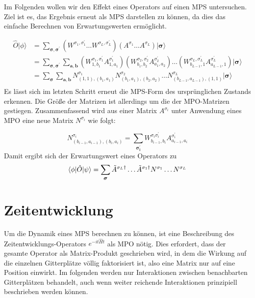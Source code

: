 \documentclass[10pt,a4paper]{report}
\begin{document}
Im Folgenden wollen wir den Effekt eines Operators auf einen MPS untersuchen. Ziel ist es, das Ergebnis erneut als MPS darstellen zu können, da dies das einfache Berechnen von Erwartungswerten ermöglicht.

\begin{equation}\label{MPO_MPS_equ}
\begin{split}
\hat{O}|\phi\rangle & = \sum_{\bm{\sigma},\bm{\sigma^\prime}}(W^{\sigma_1,\sigma_1^\prime}\ldots W^{\sigma_L,\sigma_L^\prime})(A^{\sigma_1}\ldots A^{\sigma_L})|\bm{\sigma}\rangle \\
& =\sum_{\bm{\sigma},\bm{\sigma^\prime}}\sum_{\bm{a},\bm{b}}(W_{1,b_1}^{\sigma_1,\sigma_1^\prime}A_{1,a_1}^{\sigma_1^\prime})(W_{b_1,b_2}^{\sigma_2,\sigma_2^\prime}A_{a_1,a_2}^{\sigma_2^\prime})\ldots(W_{b_{L-1},1}^{\sigma_L,\sigma_L^\prime}A_{a_{L-1},1}^{\sigma_L^\prime})|\bm{\sigma}\rangle \\
&=\sum_{\bm{\sigma}}\sum_{\bm{a},\bm{b}}N_{(1,1),(b_1,a_1)}^{\sigma_1}N_{(b_1,a_1),(b_2,a_2)}^{\sigma_2}\ldots N_{(b_{L-1},a_{L-1}),(1,1)}^{\sigma_L}|\bm{\sigma}\rangle \\
\end{split}
\end{equation}
Es lässt sich im letzten Schritt erneut die MPS-Form des ursprünglichen Zustands erkennen. Die Größe der Matrizen ist allerdings um die der MPO-Matrizen gestiegen. Zusammenfassend wird aus einer Matrix $A^{\sigma_i}$ unter Anwendung eines MPO eine neue Matrix $N^{\sigma_i}$ wie folgt:

\begin{equation}
N_{(b_{i-1},a_{i-1}),(b_i,a_i)}^{\sigma_i}=\sum_{\bm{\sigma_i^\prime}}W_{b_{i-1},b_i}^{\sigma_i\sigma_i^\prime}A_{a_{i-1},a_i}^{\sigma_i^\prime}
\end{equation}
Damit ergibt sich der Erwartungswert eines Operators zu
\begin{equation}
\langle\phi|\hat{O}|\psi\rangle=\sum_{\bm{\sigma}}\tilde{A}^{\sigma_L \dagger}\ldots\tilde{A}^{\sigma_1 \dagger} N^{\sigma_1}\ldots N^{\sigma_L}\\
\end{equation}

\section{Zeitentwicklung}\label{tMPS}

Um die Dynamik eines MPS berechnen zu können, ist eine Beschreibung des Zeitentwicklungs-Operators $e^{-it\hat{H}t}$ als MPO nötig. Dies erfordert, dass der gesamte Operator als Matrix-Produkt geschrieben wird, in dem die Wirkung auf die einzelnen Gitterplätze völlig faktorisiert ist, also eine Matrix nur auf eine Position einwirkt. Im folgenden werden nur Interaktionen zwischen benachbarten Gitterplätzen behandelt, auch wenn weiter reichende Interaktionen prinzipiell beschrieben werden können.
\end{document}
